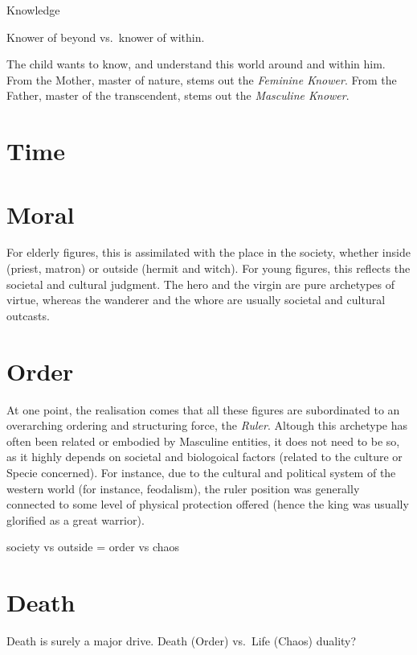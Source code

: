 \documentclass[
]{book}
\begin{document}
Knowledge

Knower of beyond vs.~knower of within.

The child wants to know, and understand this world around and within him. From the Mother, master of nature, stems out the \emph{Feminine Knower}. From the Father, master of the transcendent, stems out the \emph{Masculine Knower}.

\hypertarget{time}{%
\section{Time}\label{time}}

\hypertarget{moral}{%
\section{Moral}\label{moral}}

For elderly figures, this is assimilated with the place in the society, whether inside (priest, matron) or outside (hermit and witch). For young figures, this reflects the societal and cultural judgment. The hero and the virgin are pure archetypes of virtue, whereas the wanderer and the whore are usually societal and cultural outcasts.

\hypertarget{order}{%
\section{Order}\label{order}}

At one point, the realisation comes that all these figures are subordinated to an overarching ordering and structuring force, the \emph{Ruler}. Altough this archetype has often been related or embodied by Masculine entities, it does not need to be so, as it highly depends on societal and biologoical factors (related to the culture or Specie concerned). For instance, due to the cultural and political system of the western world (for instance, feodalism), the ruler position was generally connected to some level of physical protection offered (hence the king was usually glorified as a great warrior).

society vs outside = order vs chaos

\hypertarget{death}{%
\section{Death}\label{death}}

Death is surely a major drive. Death (Order) vs.~Life (Chaos) duality?
\end{document}
